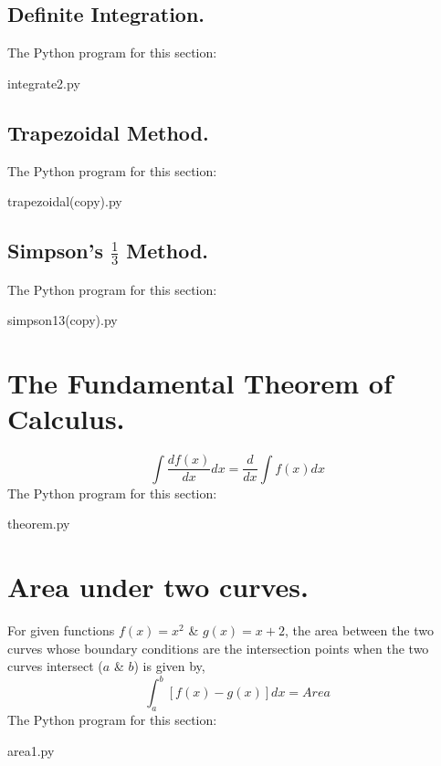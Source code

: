 \documentclass{article}
\begin{document}
\subsection{Definite Integration.}
The Python program for this section:

{integrate2.py}

\newpage
\subsection{Trapezoidal Method.}
The Python program for this section:

{trapezoidal(copy).py}

\newpage
\subsection{Simpson's $\frac{1}{3}$ Method.}
The Python program for this section:

{simpson13(copy).py}

\newpage
\section{The Fundamental Theorem of Calculus.}
\begin{equation}
\int \frac{d f(x)}{dx} dx = \frac{d}{dx}\int f(x)dx
\end{equation}
The Python program for this section:

{theorem.py}

\newpage
\section{Area under two curves.}
For given functions $f(x)=x^{2}$ \& $g(x)=x+2$, the area between the two curves whose boundary conditions are the intersection points when the two curves intersect ($a$ \& $b$) is given by,  
\begin{equation}
\int_{a}^{b}[f(x)-g(x)] dx = Area
\end{equation}
The Python program for this section:

{area1.py}
\end{document}
